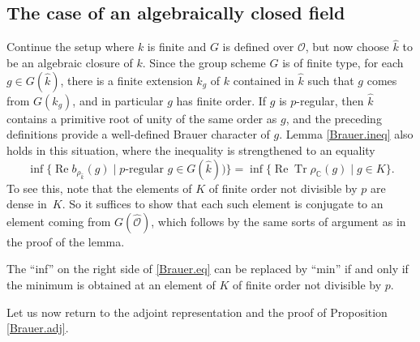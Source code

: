 \documentclass[JEP,XML,SOM,Unicode,NoFloatCountersInSection,published]{cedram}
\theoremstyle{definition}
\newcommand{\C}{\mathbb{C}}
\newcommand{\mcO}{\mathcal{O}}
\let\cO\mcO
\newcommand{\cOh}{\hat{\mcO}}
\DeclareMathOperator{\RE}{Re}
\renewcommand{\Re}{\RE}
\DeclareMathOperator{\Tr}{Tr}
\newcommand{\kh}{\hat{k}}
\begin{document}
\subsection*{The case of an algebraically closed field} Continue the setup where $k$ is finite and $G$ is defined over $\cO$, but now choose $\kh$ to be an algebraic closure of $k$. Since the group scheme $G$ is of finite type, for each $g \in G(\kh)$, there is a finite extension $k_g$ of $k$ contained in $\kh$ such that $g$ comes from $G(k_g)$, and in particular $g$ has finite order. If $g$ is $p$-regular, then $\kh$ contains a primitive root of unity of the same order as $g$, and the preceding definitions provide a well-defined Brauer character of $g$. Lemma \ref{Brauer.ineq} also holds in this situation, where the inequality is strengthened to an equality
\begin{equation} \label{Brauer.eq}
\inf \{\Re b_{\rho_{\kh}}(g) \mid \text{$p$-regular $g \in G(\kh)$})\} = \inf \{\Re \Tr \rho_{\C}(g) \mid g \in K \}.
\end{equation}
To see this, note that the elements of $K$ of finite order not divisible by $p$ are dense in~$K$. So it suffices to show that each such element is conjugate to an element coming from $G(\cOh)$, which follows by the same sorts of argument as in the proof of the lemma.

The ``inf'' on the right side of \eqref{Brauer.eq} can be replaced by ``min'' if and only if the minimum is obtained at an element of $K$ of finite order not divisible by $p$.

Let us now return to the adjoint representation and the proof of Proposition \ref{Brauer.adj}.
\end{document}
